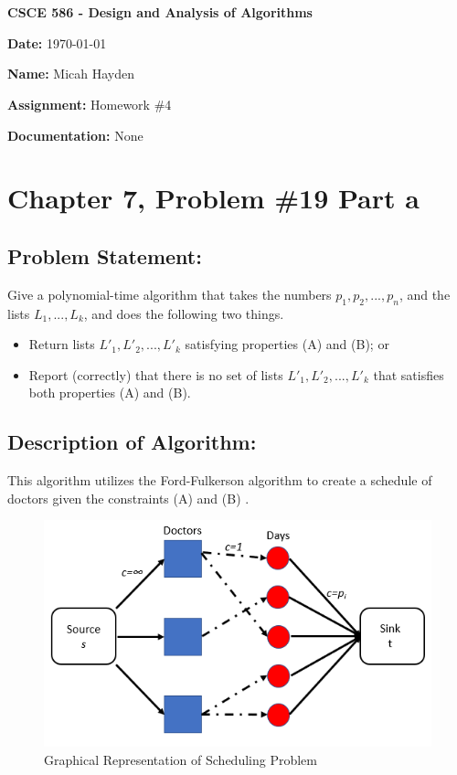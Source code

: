 \documentclass{article}
\begin{document}
\section*{} %
\noindent \textbf{CSCE 586 - Design and Analysis of Algorithms}

\noindent \textbf{Date:}  \today 

\noindent \textbf{Name:}  Micah Hayden

\noindent \textbf{Assignment:}  Homework \#4

\noindent \textbf{Documentation:} None 

\hrulefill


\section*{Chapter 7, Problem \#19 Part a}

\subsection*{Problem Statement:}  
Give a polynomial-time algorithm that takes the numbers $p_1, p_2, ...,p_n$, and the lists $L_1, ..., L_k$, and does the following two things.
\begin{itemize}
	\item Return lists $L'_1, L'_2, ..., L'_k$ satisfying properties (A) and (B); or
	\item Report (correctly) that there is no set of lists $L'_1, L'_2, ..., L'_k$ that satisfies both properties (A) and (B).
\end{itemize}

\subsection*{Description of Algorithm:}
This algorithm utilizes the Ford-Fulkerson algorithm to create a schedule of doctors given the constraints (A) and (B) \cite{algDesign}.

\begin{figure}[h!]
	\label{Fig_19a}
	\centering
	\includegraphics[scale=.75]{Images/19a_Flow.png}
	\caption*{
	\centering
	\footnotesize }
	\caption{Graphical Representation of Scheduling Problem}
\end{figure}
\end{document}
